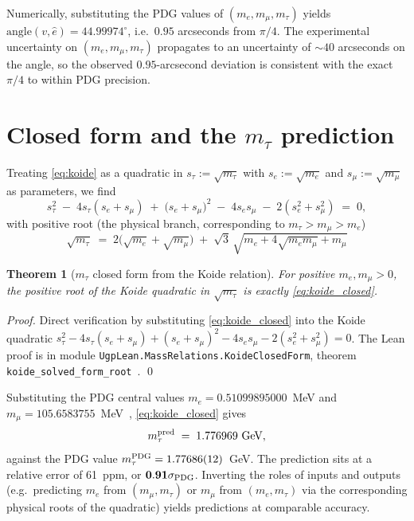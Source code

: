\documentclass[11pt]{article}
\newtheorem{theorem}{Theorem}[section]
\theoremstyle{remark}
\begin{document}
Numerically, substituting the PDG values of $(m_e, m_\mu, m_\tau)$ yields $\mathrm{angle}(v, \hat{e}) = 44.99974^\circ$, i.e.\ $0.95$ arcseconds from $\pi/4$.  The experimental uncertainty on $(m_e, m_\mu, m_\tau)$ propagates to an uncertainty of $\sim 40$ arcseconds on the angle, so the observed $0.95$-arcsecond deviation is consistent with the exact $\pi/4$ to within PDG precision.

\section{Closed form and the \texorpdfstring{$m_\tau$}{m-tau} prediction}
\label{sec:closed_form}

Treating \eqref{eq:koide} as a quadratic in $s_\tau := \sqrt{m_\tau}$ with $s_e := \sqrt{m_e}$ and $s_\mu := \sqrt{m_\mu}$ as parameters, we find
\begin{equation}
s_\tau^2 \;-\; 4 s_\tau (s_e + s_\mu) \;+\; \bigl(s_e + s_\mu\bigr)^2 \;-\; 4 s_e s_\mu \;-\; 2(s_e^2 + s_\mu^2) \;=\; 0,
\end{equation}
with positive root (the physical branch, corresponding to $m_\tau > m_\mu > m_e$)
\begin{equation}
\boxed{\;\;\sqrt{m_\tau} \;=\; 2\bigl(\sqrt{m_e} + \sqrt{m_\mu}\bigr) \;+\; \sqrt{3}\,\sqrt{m_e + 4\sqrt{m_e m_\mu} + m_\mu}\;\;}
\label{eq:koide_closed}
\end{equation}

\begin{theorem}[$m_\tau$ closed form from the Koide relation]
\label{thm:closed_form}
For positive $m_e, m_\mu > 0$, the positive root of the Koide quadratic in $\sqrt{m_\tau}$ is exactly \eqref{eq:koide_closed}.
\end{theorem}

\noindent \emph{Proof.} Direct verification by substituting \eqref{eq:koide_closed} into the Koide quadratic $s_\tau^2 - 4 s_\tau(s_e + s_\mu) + (s_e + s_\mu)^2 - 4 s_e s_\mu - 2(s_e^2 + s_\mu^2) = 0$.  The Lean proof is in module \nolinkurl{UgpLean.MassRelations.KoideClosedForm}, theorem \nolinkurl{koide_solved_form_root}~\cite{ugp-lean}. \qed

Substituting the PDG central values $m_e = 0.51099895000$~MeV and $m_\mu = 105.6583755$~MeV~\cite{ParticleDataGroup2022}, \eqref{eq:koide_closed} gives
\begin{equation}
m_\tau^{\rm pred} \;=\; 1.776969~\text{GeV},
\end{equation}
against the PDG value $m_\tau^{\rm PDG} = 1.77686(12)$~GeV.  The prediction sits at a relative error of 61~ppm, or $\mathbf{0.91\sigma_{\rm PDG}}$.  Inverting the roles of inputs and outputs (e.g.\ predicting $m_e$ from $(m_\mu, m_\tau)$ or $m_\mu$ from $(m_e, m_\tau)$ via the corresponding physical roots of the quadratic) yields predictions at comparable accuracy.
\end{document}
